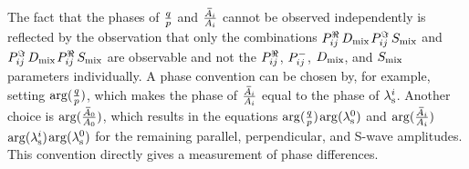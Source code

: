 The fact that the phases of $\qp$ and $\frac{\Abari}{\Ai}$ cannot be observed independently is reflected by the observation that only the
combinations $\Pre\,\Dm$\textplus$\Pim\,\Sm$ and $\Pim\,\Dm$\textminus$\Pre\,\Sm$ are observable and not the $\Pre$, $\Pmn$, $\Dm$, and
$\Sm$ parameters individually. A phase convention can be chosen by, for example, setting $\arg(\qpAlt)$, which makes the phase
of $\frac{\Abari}{\Ai}$ equal to the phase of $\lamsi$. Another choice is $\arg(\frac{\Abari[\text{0}]}{\Ai[\text{0}]})$, which
results in the equations $\arg(\qpAlt)$\texteq$\arg(\lamsi[\text{0}])$ and
$\arg(\frac{\Abari}{\Ai})$\texteq$\arg(\lamsi)$\textminus$\arg(\lamsi[\text{0}])$ for the remaining parallel, perpendicular, and S-wave
amplitudes. This convention directly gives a measurement of phase differences.

